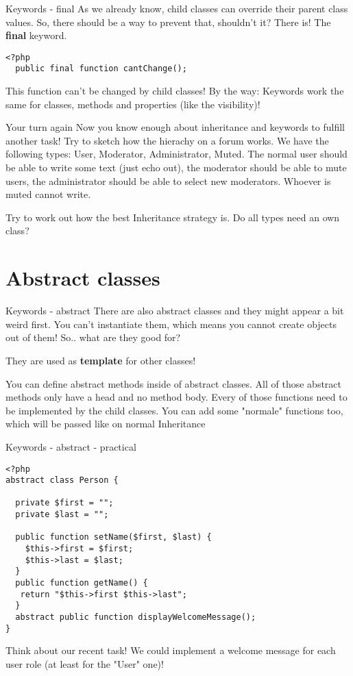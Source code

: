 \begin{frame}[fragile]{Keywords - final}
	As we already know, child classes can override their parent class values. So, there should be a way to prevent that, shouldn't it? \pause
	There is! The \textbf{final} keyword.
	\begin{lstlisting}
<?php
  public final function cantChange();
    \end{lstlisting}
    \pause
    This function can't be changed by child classes!
    By the way: Keywords work the same for classes, methods and properties (like the visibility)!
\end{frame}


\begin{frame}[fragile]{Your turn again}
	Now you know enough about inheritance and keywords to fulfill another task! \pause Try to sketch how the hierachy on a forum works. We have the following types: User, Moderator, Administrator, Muted. The normal user should be able to write some text (just echo out), the moderator should be able to mute users, the administrator should be able to select new moderators. Whoever is muted cannot write.\pause
	
	Try to work out how the best Inheritance strategy is. \pause Do all types need an own class?
\end{frame}

\section{Abstract classes}

\begin{frame}[fragile]{Keywords - abstract}
	There are also abstract classes and they might appear a bit weird first. You can't instantiate them, which means you cannot create objects out of them!
	So.. what are they good for?\pause
	
	They are used as \textbf{template} for other classes! 
	
	You can define abstract methods inside of abstract classes. All of those abstract methods only have a head and no method body. Every of those functions need to be implemented by the child classes. You can add some "normale" functions too, which will be passed like on normal Inheritance
\end{frame}

\begin{frame}[fragile]{Keywords - abstract - practical}
	\begin{lstlisting}
<?php
abstract class Person {
 
  private $first = ""; 
  private $last = "";
 
  public function setName($first, $last) {
    $this->first = $first;
    $this->last = $last;
  }
  public function getName() {
   return "$this->first $this->last";
  }
  abstract public function displayWelcomeMessage();
}
	\end{lstlisting}
	\pause
	Think about our recent task! We could implement a welcome message for each user role (at least for the "User" one)!
\end{frame}

